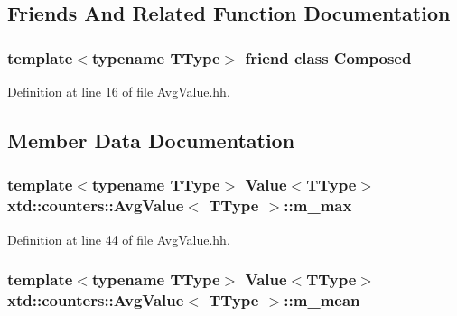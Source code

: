 \subsection{Friends And Related Function Documentation}
\subsubsection[{\texorpdfstring{Composed}{Composed}}]{\setlength{\rightskip}{0pt plus 5cm}template$<$typename T\+Type$>$ friend class {\bf Composed}\hspace{0.3cm}{\ttfamily [friend]}}\hypertarget{classxtd_1_1counters_1_1AvgValue_a93e934ad70d5b32b14beed5572450abf}{}\label{classxtd_1_1counters_1_1AvgValue_a93e934ad70d5b32b14beed5572450abf}


Definition at line 16 of file Avg\+Value.\+hh.



\subsection{Member Data Documentation}
\subsubsection[{\texorpdfstring{m\+\_\+max}{m_max}}]{\setlength{\rightskip}{0pt plus 5cm}template$<$typename T\+Type$>$ {\bf Value}$<$T\+Type$>$ {\bf xtd\+::counters\+::\+Avg\+Value}$<$ T\+Type $>$\+::m\+\_\+max\hspace{0.3cm}{\ttfamily [protected]}}\hypertarget{classxtd_1_1counters_1_1AvgValue_a9ee9567a0a95cf6b579c13329f21f0d5}{}\label{classxtd_1_1counters_1_1AvgValue_a9ee9567a0a95cf6b579c13329f21f0d5}


Definition at line 44 of file Avg\+Value.\+hh.

\subsubsection[{\texorpdfstring{m\+\_\+mean}{m_mean}}]{\setlength{\rightskip}{0pt plus 5cm}template$<$typename T\+Type$>$ {\bf Value}$<$T\+Type$>$ {\bf xtd\+::counters\+::\+Avg\+Value}$<$ T\+Type $>$\+::m\+\_\+mean\hspace{0.3cm}{\ttfamily [protected]}}\hypertarget{classxtd_1_1counters_1_1AvgValue_afa1908ab38d3deef50e1169b1cc20f6c}{}\label{classxtd_1_1counters_1_1AvgValue_afa1908ab38d3deef50e1169b1cc20f6c}


